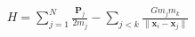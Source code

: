 \documentclass[preview]{standalone}
\begin{document}
\begin{align*}
H = \sum_{j=1}^{N}\frac{\mathbf{P}_j}{2m_j} - \sum_{j<k}\frac{Gm_jm_k}{\|\mathbf x_i-\mathbf x_j\|}
\end{align*}
\end{document}
